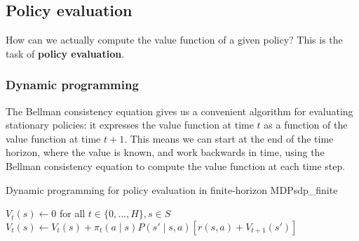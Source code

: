 \documentclass[../main/main]{subfiles}
\begin{document}
\subsection{Policy evaluation}

How can we actually compute the value function of a given policy? This is the task of \textbf{policy evaluation}.

\subsubsection{Dynamic programming}

The Bellman consistency equation gives us a convenient algorithm for evaluating stationary policies: it expresses the value function at time $t$ as a function of the value function at time $t+1$. This means we can start at the end of the time horizon, where the value is known, and work backwards in time, using the Bellman consistency equation to compute the value function at each time step.

\begin{definition}{Dynamic programming for policy evaluation in finite-horizon MDPs}{dp_finite}
    \begin{algorithmic}
\State $V_t(s) \gets 0$ for all $t \in \{ 0, \dots, H \}, s \in S$
        \State $V_t(s) \gets V_t(s) + \pi_t(a \mid s) P(s' \mid s, a) [r(s, a) + V_{t+1}(s')]$
    \EndFor
\EndFor
    \end{algorithmic}
\end{definition}
\end{document}
